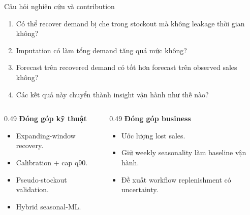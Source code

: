 \documentclass[aspectratio=169,10pt]{beamer}
\begin{document}
\begin{frame}{Câu hỏi nghiên cứu và contribution}
    \begin{enumerate}
        \item Có thể recover demand bị che trong stockout mà không leakage thời gian không?
        \item Imputation có làm tổng demand tăng quá mức không?
        \item Forecast trên recovered demand có tốt hơn forecast trên observed sales không?
        \item Các kết quả này chuyển thành insight vận hành như thế nào?
    \end{enumerate}
    \vspace{0.2cm}
    \begin{columns}[T]
        \begin{column}{0.49\linewidth}
            \textbf{Đóng góp kỹ thuật}
            \begin{itemize}
                \item Expanding-window recovery.
                \item Calibration + cap q90.
                \item Pseudo-stockout validation.
                \item Hybrid seasonal-ML.
            \end{itemize}
        \end{column}
        \begin{column}{0.49\linewidth}
            \textbf{Đóng góp business}
            \begin{itemize}
                \item Ước lượng lost sales.
                \item Giữ weekly seasonality làm baseline vận hành.
                \item Đề xuất workflow replenishment có uncertainty.
            \end{itemize}
        \end{column}
    \end{columns}
\end{frame}
\end{document}

